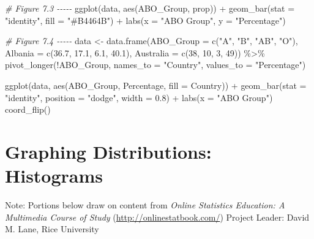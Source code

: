 \documentclass[
]{book}
\newenvironment{Shaded}{\begin{snugshade}}{\end{snugshade}}
\newcommand{\AttributeTok}[1]{\textcolor[rgb]{0.77,0.63,0.00}{#1}}
\newcommand{\CommentTok}[1]{\textcolor[rgb]{0.56,0.35,0.01}{\textit{#1}}}
\newcommand{\DecValTok}[1]{\textcolor[rgb]{0.00,0.00,0.81}{#1}}
\newcommand{\FloatTok}[1]{\textcolor[rgb]{0.00,0.00,0.81}{#1}}
\newcommand{\FunctionTok}[1]{\textcolor[rgb]{0.00,0.00,0.00}{#1}}
\newcommand{\NormalTok}[1]{#1}
\newcommand{\OtherTok}[1]{\textcolor[rgb]{0.56,0.35,0.01}{#1}}
\newcommand{\SpecialCharTok}[1]{\textcolor[rgb]{0.00,0.00,0.00}{#1}}
\newcommand{\StringTok}[1]{\textcolor[rgb]{0.31,0.60,0.02}{#1}}
\begin{document}
\begin{Shaded}
\begin{Highlighting}[]
\CommentTok{\# Figure 7.3 {-}{-}{-}{-}{-}}
\FunctionTok{ggplot}\NormalTok{(data, }\FunctionTok{aes}\NormalTok{(ABO\_Group, prop)) }\SpecialCharTok{+} 
  \FunctionTok{geom\_bar}\NormalTok{(}\AttributeTok{stat =} \StringTok{"identity"}\NormalTok{, }\AttributeTok{fill =} \StringTok{"\#B4464B"}\NormalTok{) }\SpecialCharTok{+} 
  \FunctionTok{labs}\NormalTok{(}\AttributeTok{x =} \StringTok{"ABO Group"}\NormalTok{, }\AttributeTok{y =} \StringTok{"Percentage"}\NormalTok{)}

\CommentTok{\# Figure 7.4 {-}{-}{-}{-}{-}}
\NormalTok{data }\OtherTok{\textless{}{-}} \FunctionTok{data.frame}\NormalTok{(}\AttributeTok{ABO\_Group =} \FunctionTok{c}\NormalTok{(}\StringTok{"A"}\NormalTok{, }\StringTok{"B"}\NormalTok{, }\StringTok{"AB"}\NormalTok{, }\StringTok{"O"}\NormalTok{), }
                   \AttributeTok{Albania =} \FunctionTok{c}\NormalTok{(}\FloatTok{36.7}\NormalTok{, }\FloatTok{17.1}\NormalTok{, }\FloatTok{6.1}\NormalTok{, }\FloatTok{40.1}\NormalTok{), }
                   \AttributeTok{Australia =} \FunctionTok{c}\NormalTok{(}\DecValTok{38}\NormalTok{, }\DecValTok{10}\NormalTok{, }\DecValTok{3}\NormalTok{, }\DecValTok{49}\NormalTok{)) }\SpecialCharTok{\%\textgreater{}\%}
  \FunctionTok{pivot\_longer}\NormalTok{(}\SpecialCharTok{!}\NormalTok{ABO\_Group, }\AttributeTok{names\_to =} \StringTok{"Country"}\NormalTok{, }\AttributeTok{values\_to =} \StringTok{"Percentage"}\NormalTok{)}

\FunctionTok{ggplot}\NormalTok{(data, }\FunctionTok{aes}\NormalTok{(ABO\_Group, Percentage, }\AttributeTok{fill =}\NormalTok{ Country)) }\SpecialCharTok{+} 
  \FunctionTok{geom\_bar}\NormalTok{(}\AttributeTok{stat =} \StringTok{"identity"}\NormalTok{, }\AttributeTok{position =} \StringTok{"dodge"}\NormalTok{, }\AttributeTok{width =} \FloatTok{0.8}\NormalTok{) }\SpecialCharTok{+} 
  \FunctionTok{labs}\NormalTok{(}\AttributeTok{x =} \StringTok{"ABO Group"}\NormalTok{)}
  \FunctionTok{coord\_flip}\NormalTok{()}
\end{Highlighting}
\end{Shaded}

\hypertarget{graphing-distributions-histograms}{%
\chapter{Graphing Distributions: Histograms}\label{graphing-distributions-histograms}}

Note: Portions below draw on content from
\emph{Online Statistics Education: A Multimedia Course of Study}
(\url{http://onlinestatbook.com/}) Project Leader: David M. Lane, Rice University
\end{document}
